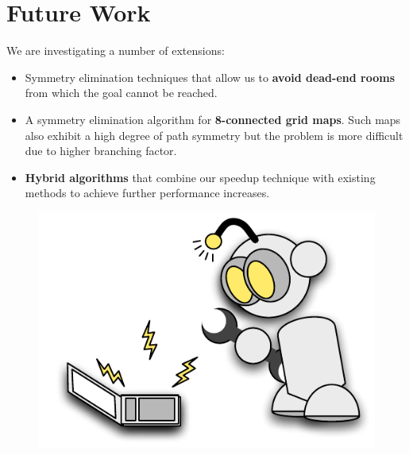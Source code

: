 

\section{Future Work}
We are investigating a number of extensions:
\begin{itemize}
\item{Symmetry elimination techniques that allow us to \textbf{avoid dead-end rooms} from which the goal cannot be reached. }
\item{A symmetry elimination algorithm for \textbf{8-connected grid maps}.
Such maps also exhibit a high degree of path symmetry but the problem is more
difficult due to higher branching factor.
}
\item{\textbf{Hybrid algorithms} that combine our speedup technique with existing methods
to achieve further performance increases.}
\end{itemize}

 \begin{figure}[b]
 \centering
		\includegraphics[width=0.7\columnwidth]{diagrams/robot_mechanic.pdf}
 \end{figure}
